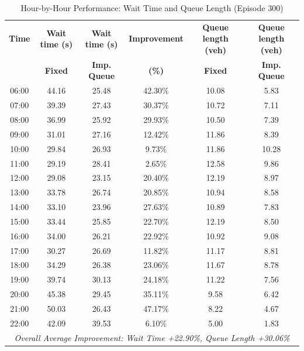 \begin{table}[H]
\centering
\caption{Hour-by-Hour Performance: Wait Time and Queue Length (Episode 300)}
\label{tab:wait_queue_comparison}
\small
\begin{tabular}{|c|c|c|c|c|c|}
\hline
\textbf{Time} & \textbf{Wait time (s)} & \textbf{Wait time (s)} & \textbf{Improvement} & \textbf{Queue length (veh)} & \textbf{Queue length (veh)} \\
 & \textbf{Fixed} & \textbf{Imp. Queue} & \textbf{(\%)} & \textbf{Fixed} & \textbf{Imp. Queue} \\
\hline
06:00 & 44.16 & 25.48 & 42.30\% & 10.08 & 5.83 \\
07:00 & 39.39 & 27.43 & 30.37\% & 10.72 & 7.11 \\
08:00 & 36.99 & 25.92 & 29.93\% & 10.50 & 7.39 \\
09:00 & 31.01 & 27.16 & 12.42\% & 11.86 & 8.39 \\
10:00 & 29.84 & 26.93 & 9.73\% & 11.86 & 10.28 \\
11:00 & 29.19 & 28.41 & 2.65\% & 12.58 & 9.86 \\
12:00 & 29.08 & 23.15 & 20.40\% & 12.19 & 8.97 \\
13:00 & 33.78 & 26.74 & 20.85\% & 10.94 & 8.58 \\
14:00 & 33.10 & 23.96 & 27.63\% & 10.89 & 7.83 \\
15:00 & 33.44 & 25.85 & 22.70\% & 12.19 & 8.50 \\
16:00 & 34.00 & 26.21 & 22.92\% & 10.92 & 9.08 \\
17:00 & 30.27 & 26.69 & 11.82\% & 11.17 & 8.81 \\
18:00 & 34.29 & 26.38 & 23.06\% & 11.67 & 8.78 \\
19:00 & 39.74 & 30.13 & 24.18\% & 11.22 & 7.56 \\
20:00 & 45.38 & 29.45 & 35.11\% & 9.58 & 6.42 \\
21:00 & 50.03 & 26.43 & 47.17\% & 8.22 & 4.67 \\
22:00 & 42.09 & 39.53 & 6.10\% & 5.00 & 1.83 \\
\hline
\multicolumn{6}{|c|}{\textit{Overall Average Improvement: Wait Time +22.90\%, Queue Length +30.06\%}} \\
\hline
\end{tabular}
\end{table}

